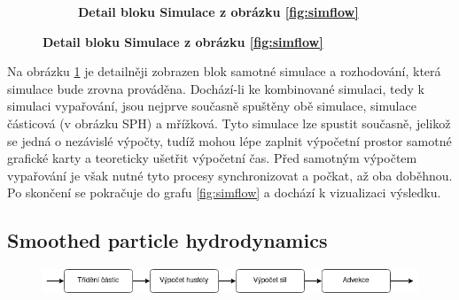 \begin{figure}[h]
\begin{subfigure}[t]{.5\textwidth}
		\caption{\textbf{Detail bloku Simulace z obrázku \ref{fig:simflow}}}
		\label{fig:simTypeflow}
	\end{subfigure}
	\label{fig:SimulationFlow}
\end{figure}

Na obrázku \ref{fig:simTypeflow} je detailněji zobrazen blok samotné simulace a rozhodování, která simulace bude zrovna prováděna. Dochází-li ke kombinované simulaci, tedy k simulaci vypařování, jsou nejprve současně spuštěny obě simulace, simulace částicová (v obrázku SPH) a mřížková. Tyto simulace lze spustit současně, jelikož se jedná o nezávislé výpočty, tudíž mohou lépe zaplnit výpočetní prostor samotné grafické karty a teoreticky ušetřit výpočetní čas. Před samotným výpočtem vypařování je však nutné tyto procesy synchronizovat a počkat, až oba doběhnou. Po skončení se pokračuje do grafu \ref{fig:simflow} a dochází k vizualizaci výsledku.


\subsection{Smoothed particle hydrodynamics}
\label{chapter:simSPH}

\begin{figure}[hb!]
	\centering
	\captionsetup{justification=centering}
	\includegraphics[scale=0.6]{obrazky-figures/SPH.png}
	\label{fig:SPHflow}
\end{figure}

